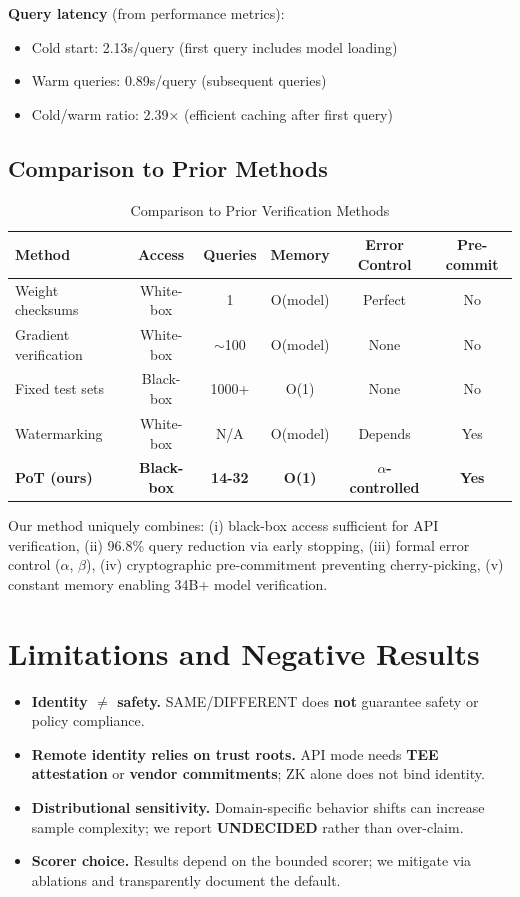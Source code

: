 \documentclass{article}
\begin{document}
\textbf{Query latency} (from performance metrics):
\begin{itemize}
\item Cold start: 2.13s/query (first query includes model loading)
\item Warm queries: 0.89s/query (subsequent queries)
\item Cold/warm ratio: 2.39× (efficient caching after first query)
\end{itemize}

\subsection{Comparison to Prior Methods}

\begin{table}[h]
\centering
\caption{Comparison to Prior Verification Methods}
\begin{tabular}{lccccc}
\toprule
Method & Access & Queries & Memory & Error Control & Pre-commit \\
\midrule
Weight checksums & White-box & 1 & O(model) & Perfect & No \\
Gradient verification \cite{jia2021proof} & White-box & $\sim$100 & O(model) & None & No \\
Fixed test sets \cite{hendrycks2021many} & Black-box & 1000+ & O(1) & None & No \\
Watermarking \cite{uchida2017embedding} & White-box & N/A & O(model) & Depends & Yes \\
\textbf{PoT (ours)} & \textbf{Black-box} & \textbf{14-32} & \textbf{O(1)} & \textbf{$\alpha$-controlled} & \textbf{Yes} \\
\bottomrule
\end{tabular}
\end{table}

Our method uniquely combines: (i) black-box access sufficient for API verification, (ii) 96.8\% query reduction via early stopping, (iii) formal error control ($\alpha$, $\beta$), (iv) cryptographic pre-commitment preventing cherry-picking, (v) constant memory enabling 34B+ model verification.

\section{Limitations and Negative Results}

\begin{itemize}
\item \textbf{Identity $\neq$ safety.} SAME/DIFFERENT does \textbf{not} guarantee safety or policy compliance.  
\item \textbf{Remote identity relies on trust roots.} API mode needs \textbf{TEE attestation} or \textbf{vendor commitments}; ZK alone does not bind identity.  
\item \textbf{Distributional sensitivity.} Domain-specific behavior shifts can increase sample complexity; we report \textbf{UNDECIDED} rather than over-claim.  
\item \textbf{Scorer choice.} Results depend on the bounded scorer; we mitigate via ablations and transparently document the default.
\end{itemize}
\end{document}
